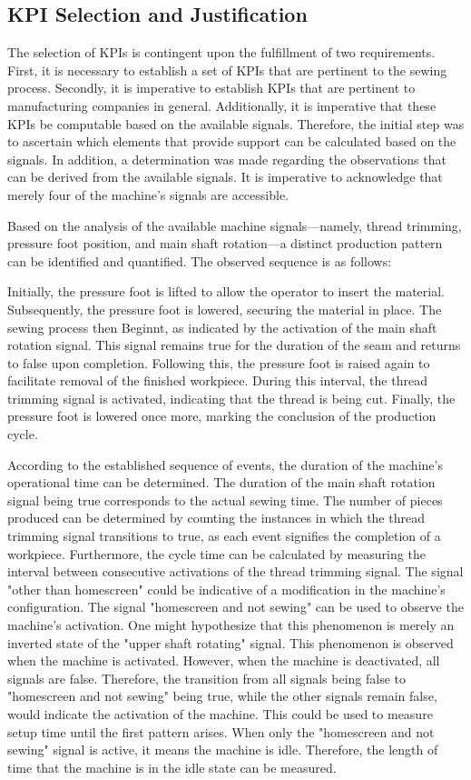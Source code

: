 {\subsection{KPI Selection and Justification}
The selection of KPIs is contingent upon the fulfillment of two requirements. First, it is necessary to establish a set of KPIs that are pertinent to the sewing process. Secondly, it is imperative to establish KPIs that are pertinent to manufacturing companies in general. Additionally, it is imperative that these KPIs be computable based on the available signals. Therefore, the initial step was to ascertain which elements that provide support can be calculated based on the signals. In addition, a determination was made regarding the observations that can be derived from the available signals. It is imperative to acknowledge that merely four of the machine's signals are accessible.

Based on the analysis of the available machine signals—namely, thread trimming, pressure foot position, and main shaft rotation—a distinct production pattern can be identified and quantified. The observed sequence is as follows:

Initially, the pressure foot is lifted to allow the operator to insert the material. Subsequently, the pressure foot is lowered, securing the material in place. The sewing process then Beginnt, as indicated by the activation of the main shaft rotation signal. This signal remains true for the duration of the seam and returns to false upon completion. Following this, the pressure foot is raised again to facilitate removal of the finished workpiece. During this interval, the thread trimming signal is activated, indicating that the thread is being cut. Finally, the pressure foot is lowered once more, marking the conclusion of the production cycle.

According to the established sequence of events, the duration of the machine's operational time can be determined. The duration of the main shaft rotation signal being true corresponds to the actual sewing time. The number of pieces produced can be determined by counting the instances in which the thread trimming signal transitions to true, as each event signifies the completion of a workpiece. Furthermore, the cycle time can be calculated by measuring the interval between consecutive activations of the thread trimming signal.
The signal "other than homescreen" could be indicative of a modification in the machine's configuration.
The signal "homescreen and not sewing" can be used to observe the machine's activation. One might hypothesize that this phenomenon is merely an inverted state of the "upper shaft rotating" signal. This phenomenon is observed when the machine is activated. However, when the machine is deactivated, all signals are false. Therefore, the transition from all signals being false to "homescreen and not sewing" being true, while the other signals remain false, would indicate the activation of the machine. This could be used to measure setup time until the first pattern arises.
When only the "homescreen and not sewing" signal is active, it means the machine is idle. Therefore, the length of time that the machine is in the idle state can be measured.

}
